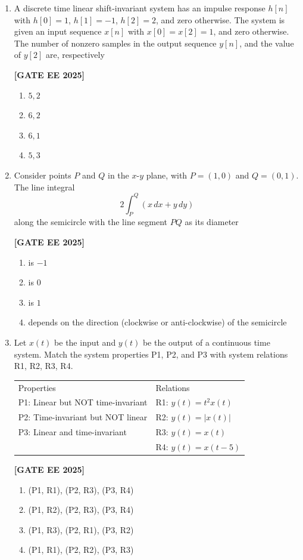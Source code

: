 \documentclass[12pt]{article}
\begin{document}
\begin{enumerate}[leftmargin=*, label=\textbf{Q.\arabic*:}]
\item A discrete time linear shift-invariant system has an impulse response $h[n]$ with $h[0]=1$, $h[1]=-1$, $h[2]=2$, and zero otherwise. The system is given an input sequence $x[n]$ with $x[0]=x[2]=1$, and zero otherwise. The number of nonzero samples in the output sequence $y[n]$, and the value of $y[2]$ are, respectively
 
\noindent \textbf{[GATE EE 2025]}
\begin{enumerate}[label=(\Alph*)]
    \item $5, 2$
    \item $6, 2$
    \item $6, 1$
    \item $5, 3$
\end{enumerate}

\item Consider points $P$ and $Q$ in the $x$-$y$ plane, with $P = (1,0)$ and $Q = (0,1)$. The line integral
\[
2\int_P^Q (x\,dx + y\,dy)
\]
along the semicircle with the line segment $PQ$ as its diameter
 
\noindent \textbf{[GATE EE 2025]}
\begin{enumerate}[label=(\Alph*)]
  \item is $-1$
  \item is $0$
  \item is $1$
  \item depends on the direction (clockwise or anti-clockwise) of the semicircle
\end{enumerate}

\item Let $x(t)$ be the input and $y(t)$ be the output of a continuous time system. Match the system properties P1, P2, and P3 with system relations R1, R2, R3, R4.
\begin{center}
  \begin{tabular}{ll}
    Properties & Relations \\
    P1: Linear but NOT time-invariant              & R1: $y(t)=t^2 x(t) $ \\
    P2: Time-invariant but NOT linear              & R2: $y(t)=|x(t)| $ \\
    P3: Linear and time-invariant                  & R3: $y(t)=x(t)$ \\
                                                  & R4: $y(t)=x(t-5)$
  \end{tabular}
\end{center}
 
\noindent \textbf{[GATE EE 2025]}
\begin{enumerate}[label=(\Alph*)]
  \item (P1, R1), (P2, R3), (P3, R4)
  \item (P1, R2), (P2, R3), (P3, R4)
  \item (P1, R3), (P2, R1), (P3, R2)
  \item (P1, R1), (P2, R2), (P3, R3)
\end{enumerate}


\end{enumerate}
\end{document}
